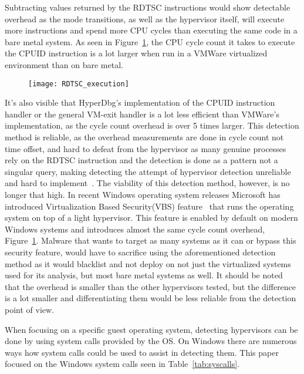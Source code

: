 Subtracting values returned by the RDTSC instructions would show detectable overhead as the mode transitions, as well as the hypervisor itself, will execute more instructions and spend more CPU cycles than executing the same code in a bare metal system. 
As seen in Figure~\ref{fig:rdtsc_overhead}, the CPU cycle count it takes to execute the CPUID instruction is a lot larger when run in a VMWare virtualized environment than on bare metal. 
\begin{figure}[tbh]
    \texttt{[image: RDTSC\_execution]} %
    \label{fig:rdtsc_overhead}
\end{figure}

It's also visible that HyperDbg's implementation of the CPUID instruction handler or the general VM-exit handler is a lot less efficient than VMWare's implementation, as the cycle count overhead is over 5 times larger. 
This detection method is reliable, as the overhead measurements are done in cycle count not time offset, and hard to defeat from the hypervisor as many genuine processes rely on the RDTSC 
instruction and the detection is done as a pattern not a singular query, making detecting the attempt of hypervisor detection unreliable and hard to implement~\cite{hypervisor-detection-timing-attacks}. 
The viability of this detection method, however, is no longer that high. In recent Windows operating system releases Microsoft has introduced Virtualization Based Security(VBS) feature~\cite{windows-vbs} 
that runs the operating system on top of a light hypervisor. This feature is enabled by default on modern Windows systems and introduces almost the same cycle count overhead, Figure~\ref{fig:rdtsc_overhead}. 
Malware that wants to target as many systems as it can or bypass this security feature, would have to sacrifice using the aforementioned detection method as it would blacklist and not deploy on not just the virtualized systems used for its analysis, 
but most bare metal systems as well. It should be noted that the overhead is smaller than the other hypervisors tested, but the difference is a lot smaller and differentiating them would be less reliable from the detection point of view. 

When focusing on a specific guest operating system, detecting hypervisors can be done by using system calls provided by the OS. 
On Windows there are numerous ways how system calls could be used to assist in detecting them. This paper focused on the Windows system calls seen in Table~\ref{tab:syscalls}. 

